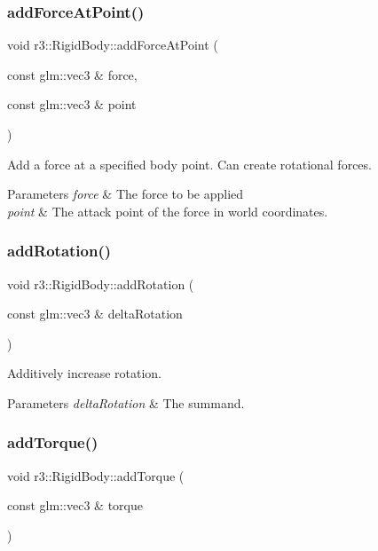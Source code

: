 \subsubsection{\texorpdfstring{add\+Force\+At\+Point()}{addForceAtPoint()}}
{\footnotesize\ttfamily void r3\+::\+Rigid\+Body\+::add\+Force\+At\+Point (\begin{DoxyParamCaption}\item[{const glm\+::vec3 \&}]{force,  }\item[{const glm\+::vec3 \&}]{point }\end{DoxyParamCaption})}



Add a force at a specified body point. Can create rotational forces. 


\begin{DoxyParams}{Parameters}
{\em force} & The force to be applied \\
\hline
{\em point} & The attack point of the force in world coordinates. \\
\hline
\end{DoxyParams}
\mbox{\label{classr3_1_1_rigid_body_aaa3f92c7abc8b733a3dac8841ff41b61}} 
\subsubsection{\texorpdfstring{add\+Rotation()}{addRotation()}}
{\footnotesize\ttfamily void r3\+::\+Rigid\+Body\+::add\+Rotation (\begin{DoxyParamCaption}\item[{const glm\+::vec3 \&}]{delta\+Rotation }\end{DoxyParamCaption})}



Additively increase rotation. 


\begin{DoxyParams}{Parameters}
{\em delta\+Rotation} & The summand. \\
\hline
\end{DoxyParams}
\mbox{\label{classr3_1_1_rigid_body_a276ac614e4eab3df963d64401112bd36}} 
\subsubsection{\texorpdfstring{add\+Torque()}{addTorque()}}
{\footnotesize\ttfamily void r3\+::\+Rigid\+Body\+::add\+Torque (\begin{DoxyParamCaption}\item[{const glm\+::vec3 \&}]{torque }\end{DoxyParamCaption})}



